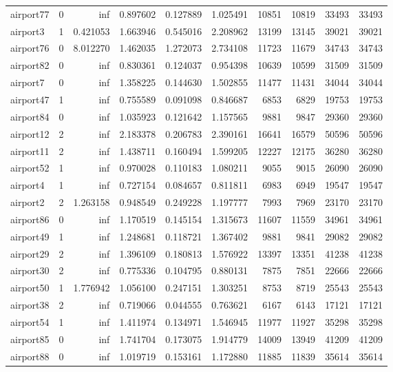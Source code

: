 \begin{longtable}{|l|r|r|r|r|r|r|r|r|r|}
airport77 & 0 & inf & 0.897602 & 0.127889 & 1.025491 & 10851 & 10819 & 33493 & 33493 \\
airport3 & 1 & 0.421053 & 1.663946 & 0.545016 & 2.208962 & 13199 & 13145 & 39021 & 39021 \\
airport76 & 0 & 8.012270 & 1.462035 & 1.272073 & 2.734108 & 11723 & 11679 & 34743 & 34743 \\
airport82 & 0 & inf & 0.830361 & 0.124037 & 0.954398 & 10639 & 10599 & 31509 & 31509 \\
airport7 & 0 & inf & 1.358225 & 0.144630 & 1.502855 & 11477 & 11431 & 34044 & 34044 \\
airport47 & 1 & inf & 0.755589 & 0.091098 & 0.846687 & 6853 & 6829 & 19753 & 19753 \\
airport84 & 0 & inf & 1.035923 & 0.121642 & 1.157565 & 9881 & 9847 & 29360 & 29360 \\
airport12 & 2 & inf & 2.183378 & 0.206783 & 2.390161 & 16641 & 16579 & 50596 & 50596 \\
airport11 & 2 & inf & 1.438711 & 0.160494 & 1.599205 & 12227 & 12175 & 36280 & 36280 \\
airport52 & 1 & inf & 0.970028 & 0.110183 & 1.080211 & 9055 & 9015 & 26090 & 26090 \\
airport4 & 1 & inf & 0.727154 & 0.084657 & 0.811811 & 6983 & 6949 & 19547 & 19547 \\
airport2 & 2 & 1.263158 & 0.948549 & 0.249228 & 1.197777 & 7993 & 7969 & 23170 & 23170 \\
airport86 & 0 & inf & 1.170519 & 0.145154 & 1.315673 & 11607 & 11559 & 34961 & 34961 \\
airport49 & 1 & inf & 1.248681 & 0.118721 & 1.367402 & 9881 & 9841 & 29082 & 29082 \\
airport29 & 2 & inf & 1.396109 & 0.180813 & 1.576922 & 13397 & 13351 & 41238 & 41238 \\
airport30 & 2 & inf & 0.775336 & 0.104795 & 0.880131 & 7875 & 7851 & 22666 & 22666 \\
airport50 & 1 & 1.776942 & 1.056100 & 0.247151 & 1.303251 & 8753 & 8719 & 25543 & 25543 \\
airport38 & 2 & inf & 0.719066 & 0.044555 & 0.763621 & 6167 & 6143 & 17121 & 17121 \\
airport54 & 1 & inf & 1.411974 & 0.134971 & 1.546945 & 11977 & 11927 & 35298 & 35298 \\
airport85 & 0 & inf & 1.741704 & 0.173075 & 1.914779 & 14009 & 13949 & 41209 & 41209 \\
airport88 & 0 & inf & 1.019719 & 0.153161 & 1.172880 & 11885 & 11839 & 35614 & 35614 \\

\end{longtable}

